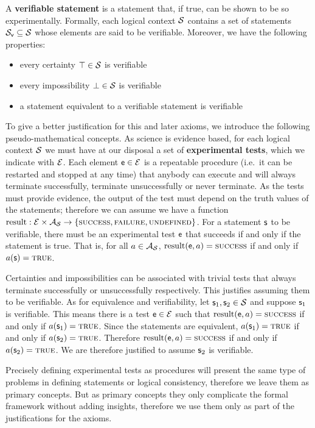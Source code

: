 \documentclass[11pt,letterpaper,fleqn]{memoir} %
\begin{document}
\begin{mathSection}
\begin{axiom}\label{ax_verifiable_statements}
	A \textbf{verifiable statement} is a statement that, if true, can be shown to be so experimentally. Formally, each logical context $\mathcal{S}$ contains a set of statements $\mathcal{S}_\textsf{v} \subseteq \mathcal{S}$ whose elements are said to be verifiable. Moreover, we have the following properties:
	\begin{itemize}
		\item every certainty $\top \in \mathcal{S}$ is verifiable
		\item every impossibility $\bot \in \mathcal{S}$ is verifiable
		\item a statement equivalent to a verifiable statement is verifiable
	\end{itemize}
\end{axiom}
\begin{justification}
	To give a better justification for this and later axioms, we introduce the following pseudo-mathematical concepts. As science is evidence based, for each logical context $\mathcal{S}$ we must have at our disposal a set of \textbf{experimental tests}, which we indicate with $\mathcal{E}$. Each element $\mathsf{e} \in \mathcal{E}$ is a repeatable procedure (i.e.~it can be restarted and stopped at any time) that anybody can execute and will always terminate successfully, terminate unsuccessfully or never terminate. As the tests must provide evidence, the output of the test must depend on the truth values of the statements; therefore we can assume we have a function $\operatorname{result}: \mathcal{E} \times \mathcal{A}_{\mathcal{S}} \to \{\textsc{success}, \textsc{failure}, \textsc{undefined}\}$. For a statement $\mathsf{s}$ to be verifiable, there must be an experimental test $\mathsf{e}$ that succeeds if and only if the statement is true. That is, for all $a \in \mathcal{A}_{\mathcal{S}}$, $\operatorname{result}(\mathsf{e}, a) = \textsc{success}$ if and only if $a(\mathsf{s}) = \textsc{true}$.
	
	Certainties and impossibilities can be associated with trivial tests that always terminate successfully or unsuccessfully respectively. This justifies assuming them to be verifiable. As for equivalence and verifiability, let $\mathsf{s}_1, \mathsf{s}_2 \in \mathcal{S}$ and suppose $\mathsf{s}_1$ is verifiable. This means there is a test $\mathsf{e} \in \mathcal{E}$ such that $\operatorname{result}(\mathsf{e}, a) = \textsc{success}$ if and only if $a(\mathsf{s}_1) = \textsc{true}$. Since the statements are equivalent, $a(\mathsf{s}_1) = \textsc{true}$ if and only if $a(\mathsf{s}_2) = \textsc{true}$. Therefore $\operatorname{result}(\mathsf{e}, a) = \textsc{success}$ if and only if $a(\mathsf{s}_2) = \textsc{true}$. We are therefore justified to assume $\mathsf{s}_2$ is verifiable.
	
	Precisely defining experimental tests as procedures will present the same type of problems in defining statements or logical consistency, therefore we leave them as primary concepts. But as primary concepts they only complicate the formal framework without adding insights, therefore we use them only as part of the justifications for the axioms.
\end{justification}
\end{mathSection}
\end{document}
